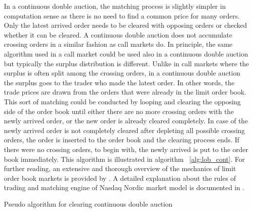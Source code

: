 In a continuous double auction, the matching process is slightly simpler in computation
sense as there is no need to find a common price for many orders. Only the latest arrived
order needs to be cleared with opposing orders or checked whether it can be cleared. A continuous
double auction does not accumulate crossing orders in a similar fashion as call markets do. 
In principle, the same algorithm used in a call market could be used also in a continuous double auction 
but typically the surplus distribution is different. Unlike in call markets where the surplus is often
split among the crossing orders, in a continuous double auction the surplus goes to the trader who made the 
latest order. In other words, the trade prices are drawn from the orders that were already in the limit 
order book. This sort of matching could be conducted by looping and clearing the opposing side of the 
order book until either there are no more crossing orders with the newly arrived order, or the new 
order is already cleared completely. In case of the newly arrived order is not completely cleared after 
depleting all possible crossing orders, the order is inserted to the order book and the clearing process 
ends. If there were no crossing orders, to begin with, the newly arrived is put to the order book immediately. 
This algorithm is illustrated in algorithm ~\ref{alg:lob_cont}. For further reading, an extensive and 
thorough overview of the mechanics of limit order book markets is provided by \citet{lob13}. A detailed 
explanation about the rules of trading and matching engine of Nasdaq Nordic market model is documented in 
\citet{NasdaqModel}.

\begin{algorithm}[H]
    \SetAlgoLined
    \DontPrintSemicolon

    \caption{Pseudo algorithm for clearing continuous double auction}
    \label{alg:lob_cont}
\end{algorithm}


